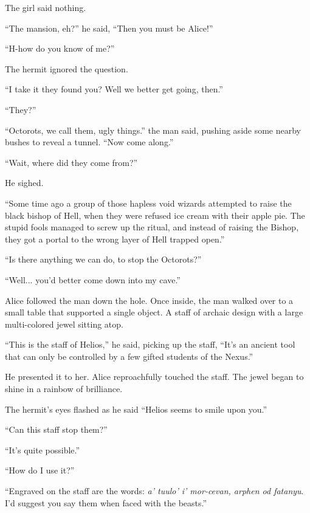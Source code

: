 \noindent
The girl said nothing.
\VV


``The mansion, eh?'' he said, ``Then you must be Alice!''


``H-how do you know of me?''
\VV


\noindent
The hermit ignored the question.
\VV


``I take it they found you? Well we better get going, then.''


``They?''

``Octorots, we call them, ugly things.'' the man said,
pushing aside some nearby bushes to reveal a tunnel. ``Now come along.''


``Wait, where did they come from?''
\VV

\noindent
He sighed.
\VV


``Some time ago a group of those hapless void wizards attempted to raise the black bishop of Hell, when they were refused ice cream with their apple pie. The stupid fools managed to screw up the ritual, and instead of raising the Bishop, they got a portal to the wrong layer of Hell trapped open.''


``Is there anything we can do, to stop the Octorots?''


``Well... you'd better come down into my cave.''
\VV

\noindent
Alice followed the man down the hole.
Once inside, the man walked over to a small table that supported a single object.
A staff of archaic design with a large multi-colored jewel sitting atop.
\VV


``This is the staff of Helios,'' he said, picking up the staff, ``It's an ancient tool that can only be controlled by a few gifted students of the Nexus.''
\VV


\noindent
He presented it to her.
Alice reproachfully touched the staff. The jewel began to shine in a rainbow of brilliance.
\VV

The hermit's eyes flashed as he said ``Helios seems to smile upon you.''


``Can this staff stop them?''


``It's quite possible.''


``How do I use it?''


``Engraved on the staff are the words: \textit{a' tuulo' i' mor-cevan, arphen od fatanyu}. I'd suggest you say them when faced with the beasts.''
\VV


